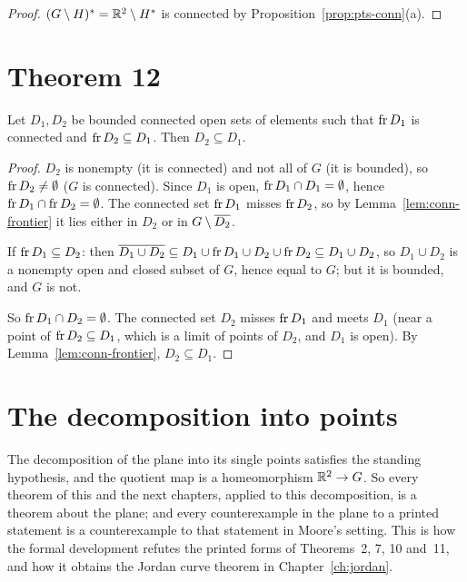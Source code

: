 \begin{proof}
$(G\setminus H)^{\ast}=\mathbb{R}^2\setminus H^{\ast}$ is connected by Proposition~\ref{prop:pts-conn}(a).
\end{proof}


\section{Theorem 12}

\begin{theorem}\label{thm:m25-12}
Let $D_1,D_2$ be bounded connected open sets of elements such that $\operatorname{fr} D_1$ is connected and $\operatorname{fr}
D_2\subseteq D_1$. Then $D_2\subseteq D_1$.
\end{theorem}

\begin{proof}
$D_2$ is nonempty (it is connected) and not all of $G$ (it is bounded), so $\operatorname{fr} D_2\ne\emptyset$ ($G$ is
connected). Since $D_1$ is open, $\operatorname{fr} D_1\cap D_1=\emptyset$, hence $\operatorname{fr} D_1\cap\operatorname{fr} D_2=\emptyset$. The
connected set $\operatorname{fr} D_1$ misses $\operatorname{fr} D_2$, so by Lemma~\ref{lem:conn-frontier} it lies either in $D_2$ or
in $G\setminus\overline{D_2}$.

If $\operatorname{fr} D_1\subseteq D_2$: then $\overline{D_1\cup D_2}\subseteq D_1\cup\operatorname{fr} D_1\cup D_2\cup\operatorname{fr} D_2\subseteq D_1\cup
D_2$, so $D_1\cup D_2$ is a nonempty open and closed subset of $G$, hence equal to $G$; but it is
bounded, and $G$ is not.

So $\operatorname{fr} D_1\cap D_2=\emptyset$. The connected set $D_2$ misses $\operatorname{fr} D_1$ and meets $D_1$ (near a point
of $\operatorname{fr} D_2\subseteq D_1$, which is a limit of points of $D_2$, and $D_1$ is open). By
Lemma~\ref{lem:conn-frontier}, $D_2\subseteq D_1$.
\end{proof}


\section{The decomposition into points}\label{sec:points}

The decomposition of the plane into its single points satisfies the standing hypothesis, and the
quotient map is a homeomorphism $\mathbb{R}^2\to G$. So every theorem of this and the next chapters, applied to
this decomposition, is a theorem about the plane; and every counterexample in the plane to a printed
statement is a counterexample to that statement in Moore's setting. This is how the formal development
refutes the printed forms of Theorems~2, 7, 10 and~11, and how it obtains the Jordan curve theorem in
Chapter~\ref{ch:jordan}.

